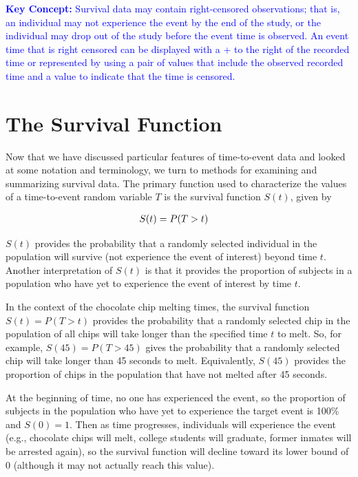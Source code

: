 \documentclass[
]{book}
\begin{document}
\textbf{\textcolor{blue}{Key Concept:}}
\textcolor{blue}{Survival data may contain right-censored observations; that is, an individual may not experience the event by the end of the study, or the individual may drop out of the study before the event time is observed. An event time that is right censored can be displayed with a + to the right of the recorded time or represented by using a pair of values that include the observed recorded time and a value to indicate that the time is censored.}

\hypertarget{the-survival-function}{%
\section{The Survival Function}\label{the-survival-function}}

Now that we have discussed particular features of time-to-event data and looked at some notation and terminology, we turn to methods for examining and summarizing survival data. The primary function used to characterize the values of a time-to-event random variable \(T\) is the survival function \(S(t)\), given by

\begin{align}
S(t) &= P(T > t)
\notag
\end{align}

\(S(t)\) provides the probability that a randomly selected individual in the population will survive (not experience the event of interest) beyond time \(t\). Another interpretation of \(S(t)\) is that it provides the proportion of subjects in a population who have yet to experience the event of interest by time \(t\).

In the context of the chocolate chip melting times, the survival function \(S(t) = P(T > t)\) provides the probability that a randomly selected chip in the population of all chips will take longer than the specified time \(t\) to melt. So, for example, \(S(45) = P(T > 45)\) gives the probability that a randomly selected chip will take longer than 45 seconds to melt. Equivalently, \(S(45)\) provides the proportion of chips in the population that have not melted after 45 seconds.

At the beginning of time, no one has experienced the event, so the proportion of subjects in the population who have yet to experience the target event is 100\% and \(S(0) = 1\). Then as time progresses, individuals will experience the event (e.g., chocolate chips will melt, college students will graduate, former inmates will be arrested again), so the survival function will decline toward its lower bound of 0 (although it may not actually reach this value).
\end{document}
